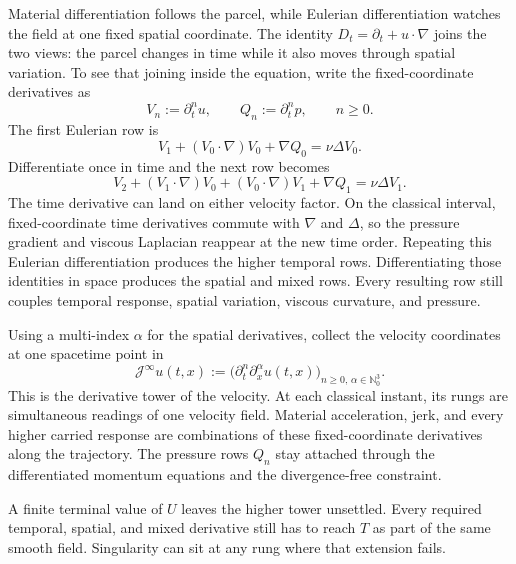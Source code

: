 Material differentiation follows the parcel, while Eulerian differentiation watches the field at one fixed spatial coordinate.
The identity \(D_t=\partial_t+u\cdot\nabla\) joins the two views: the parcel changes in time while it also moves through spatial variation.
To see that joining inside the equation, write the fixed-coordinate derivatives as
\[
  V_n:=\partial_t^nu,
  \qquad
  Q_n:=\partial_t^np,
  \qquad n\geq0.
\]
The first Eulerian row is
\[
  V_1
  +(V_0\cdot\nabla)V_0
  +\nabla Q_0
  =
  \nu\Delta V_0.
\]
Differentiate once in time and the next row becomes
\[
  V_2
  +(V_1\cdot\nabla)V_0
  +(V_0\cdot\nabla)V_1
  +\nabla Q_1
  =
  \nu\Delta V_1.
\]
The time derivative can land on either velocity factor.
On the classical interval, fixed-coordinate time derivatives commute with \(\nabla\) and \(\Delta\), so the pressure gradient and viscous Laplacian reappear at the new time order.
Repeating this Eulerian differentiation produces the higher temporal rows.
Differentiating those identities in space produces the spatial and mixed rows.
Every resulting row still couples temporal response, spatial variation, viscous curvature, and pressure.

Using a multi-index \(\alpha\) for the spatial derivatives, collect the velocity coordinates at one spacetime point in
\[
  \mathcal J^\infty u(t,x)
  :=
  \bigl(
    \partial_t^n\partial_x^\alpha u(t,x)
  \bigr)_{n\geq0,\,\alpha\in\mathbb N_0^3}.
\]
This is the derivative tower of the velocity.
At each classical instant, its rungs are simultaneous readings of one velocity field.
Material acceleration, jerk, and every higher carried response are combinations of these fixed-coordinate derivatives along the trajectory.
The pressure rows \(Q_n\) stay attached through the differentiated momentum equations and the divergence-free constraint.

A finite terminal value of \(U\) leaves the higher tower unsettled.
Every required temporal, spatial, and mixed derivative still has to reach \(T\) as part of the same smooth field.
Singularity can sit at any rung where that extension fails.
